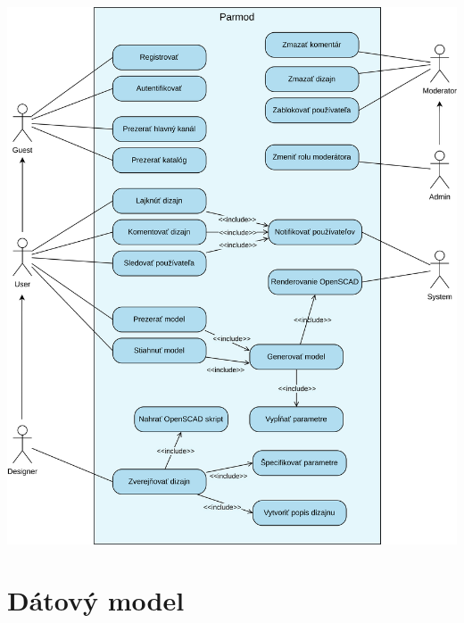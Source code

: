 \documentclass[a4paper]{article}
\begin{document}
\includegraphics[width=\linewidth]{use_case.png}


\section{Dátový model}
\end{document}
